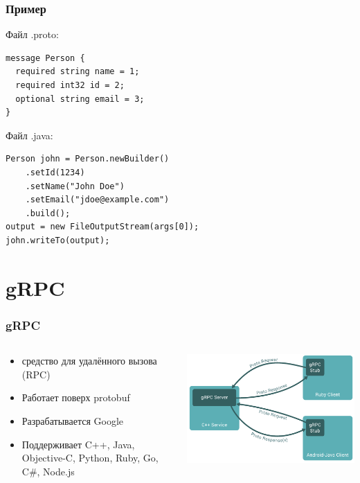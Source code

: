 \documentclass[xetex,mathserif,serif]{beamer}
\begin{document}
    \begin{frame}[fragile]
        \frametitle{Пример}
        Файл .proto:
        \begin{verbatim}
message Person {
  required string name = 1;
  required int32 id = 2;
  optional string email = 3;
}
        \end{verbatim}
        \vspace{2mm}
        Файл .java:
        \begin{verbatim}
Person john = Person.newBuilder()
    .setId(1234)
    .setName("John Doe")
    .setEmail("jdoe@example.com")
    .build();
output = new FileOutputStream(args[0]);
john.writeTo(output);
        \end{verbatim}
    \end{frame}

    \section{gRPC}

    \begin{frame}
        \frametitle{gRPC}
        \begin{columns}
            \begin{column}{0.6\textwidth}
                \begin{itemize}
                    \item средство для удалённого вызова (RPC)
                    \item Работает поверх protobuf
                    \item Разрабатывается Google
                    \item Поддерживает C++, Java, Objective-C, Python, Ruby, Go, C\#, Node.js
                \end{itemize}
            \end{column}
            \begin{column}{0.4\textwidth}
                \begin{center}
                    \includegraphics[width=\textwidth]{grpc.png}
                \end{center}
            \end{column}
        \end{columns}
    \end{frame}
\end{document}
